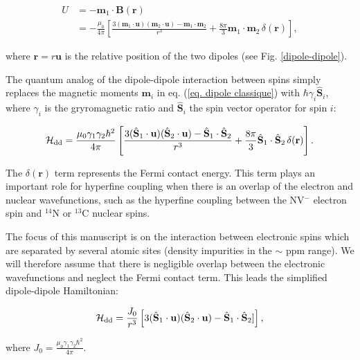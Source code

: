 \documentclass[a4paper,11pt]{report}
\begin{document}
\begin{align}
U&=-\mathbf{m}_1 \cdot \mathbf{B}(\mathbf{r}) \nonumber \\
&=-\frac{\mu_0}{4 \pi}\left[ \frac{3 (\mathbf{m}_1\cdot\mathbf{u})(\mathbf{m}_2\cdot\mathbf{u}) - \mathbf{m}_1\cdot\mathbf{m}_2}{r^3}+\frac{8\pi}{3}\mathbf{m}_1\cdot\mathbf{m}_2\,\delta(\mathbf{r})\right], \label{eq. dipole classique}
\end{align}

where $\mathbf{r}=r \mathbf{u}$ is the relative position of the two dipoles (see Fig. \ref{dipole-dipole}). 

The quantum analog of the dipole-dipole interaction between spins simply replaces the magnetic moments $\mathbf{m}_i$ in eq. (\ref{eq. dipole classique}) with $\hbar \gamma_i \hat{\mathbf{S}}_i$, where $\gamma_i$ is the gryromagnetic ratio and $\hat{\mathbf{S}}_i$ the spin vector operator for spin $i$:

\begin{equation}
\mathcal{H}_{\rm dd}=\frac{\mu_0 \gamma_1 \gamma_2 \hbar^2}{4 \pi}\left[ \frac{3 (\hat{\mathbf{S}}_1\cdot\mathbf{u})(\hat{\mathbf{S}}_2\cdot\mathbf{u}) - \hat{\mathbf{S}}_1\cdot\hat{\mathbf{S}}_2}{r^3}+\frac{8\pi}{3}\hat{\mathbf{S}}_1\cdot\hat{\mathbf{S}}_2\,\delta(\mathbf{r})\right].
\end{equation}

The $\delta(\mathbf{r})$ term represents the Fermi contact energy. This term plays an important role for hyperfine coupling when there is an overlap of the electron and nuclear wavefunctions, such as the hyperfine coupling between the NV$^-$ electron spin and $^{14}$N \cite{doherty2012theory} or  $^{13}$C \cite{smeltzer201113c} nuclear spins.

The focus of this manuscript is on the interaction between electronic spins which are separated by several atomic sites (density impurities in the $\sim$ ppm range). We will therefore assume that there is negligible overlap between the electronic wavefunctions and neglect the Fermi contact term. This leads the simplified dipole-dipole Hamiltonian:

\begin{equation}
\mathcal{H}_{\rm dd}= \frac{J_0}{r^3}\left[ 3 (\hat{\mathbf{S}}_1\cdot\mathbf{u})(\hat{\mathbf{S}}_2\cdot\mathbf{u}) - \hat{\mathbf{S}}_1\cdot\hat{\mathbf{S}}_2] \right],
\end{equation}

where $J_0=\frac{\mu_0 \gamma_1 \gamma_2 \hbar^2}{4 \pi}$.
\end{document}
